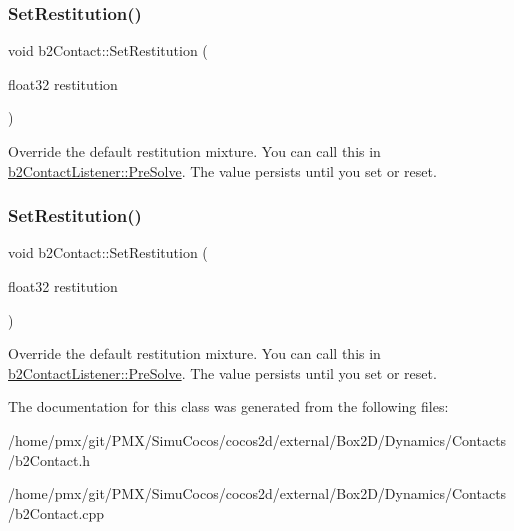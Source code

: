\subsubsection{\texorpdfstring{Set\+Restitution()}{SetRestitution()}\hspace{0.1cm}{\footnotesize\ttfamily [1/2]}}
{\footnotesize\ttfamily void b2\+Contact\+::\+Set\+Restitution (\begin{DoxyParamCaption}\item[{float32}]{restitution }\end{DoxyParamCaption})\hspace{0.3cm}{\ttfamily [inline]}}

Override the default restitution mixture. You can call this in \hyperlink{classb2ContactListener_a416f85eb45a1099053402b15a19a7de0}{b2\+Contact\+Listener\+::\+Pre\+Solve}. The value persists until you set or reset. \mbox{\label{classb2Contact_a24ca342c2bb766c53ef5ad04f5268fc1}} 
\subsubsection{\texorpdfstring{Set\+Restitution()}{SetRestitution()}\hspace{0.1cm}{\footnotesize\ttfamily [2/2]}}
{\footnotesize\ttfamily void b2\+Contact\+::\+Set\+Restitution (\begin{DoxyParamCaption}\item[{float32}]{restitution }\end{DoxyParamCaption})}

Override the default restitution mixture. You can call this in \hyperlink{classb2ContactListener_a416f85eb45a1099053402b15a19a7de0}{b2\+Contact\+Listener\+::\+Pre\+Solve}. The value persists until you set or reset. 

The documentation for this class was generated from the following files\+:\begin{DoxyCompactItemize}
\item 
/home/pmx/git/\+P\+M\+X/\+Simu\+Cocos/cocos2d/external/\+Box2\+D/\+Dynamics/\+Contacts/b2\+Contact.\+h\item 
/home/pmx/git/\+P\+M\+X/\+Simu\+Cocos/cocos2d/external/\+Box2\+D/\+Dynamics/\+Contacts/b2\+Contact.\+cpp\end{DoxyCompactItemize}
